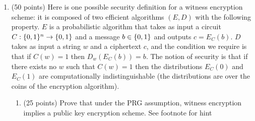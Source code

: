 \documentclass{article}
\begin{document}
\begin{enumerate}%

\item{}
(50 points) Here is one possible security definition for a witness encryption scheme: it is composed of two efficient algorithms $(E,D)$ with the following property. $E$ is a probabilistic algorithm that takes as input a circuit $C:\{0,1\}^n\rightarrow\{0,1\}$ and a message $b\in\{0,1\}$ and outputs $c=E_C(b)$. $D$ takes as input a string $w$ and a ciphertext $c$, and the condition we require is that if $C(w)=1$ then $D_w(E_C(b))=b$. The notion of security is that if there exists no $w$ such that $C(w)=1$ then the distributions $E_C(0)$ and $E_C(1)$ are computationally indistinguishable (the distributions are over the coins of the encryption algorithm).%

\begin{enumerate}[noitemsep,topsep=\mdcompacttopsep,label=\alph*.]%

\item{}
(25 points) Prove that  under the PRG assumption, witness encryption implies a public key encryption scheme. See footnote for hint%


\end{enumerate}
\end{enumerate}
\end{document}
